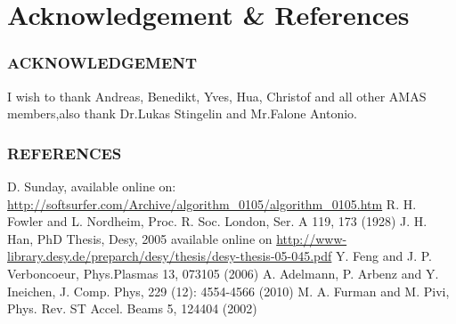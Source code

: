 \documentclass{beamer}
\begin{document}
\section*{Acknowledgement \& References}
\begin{frame}
\frametitle{ACKNOWLEDGEMENT}
I wish to thank Andreas, Benedikt, Yves, Hua, Christof and all other AMAS members,also thank Dr.Lukas Stingelin and Mr.Falone Antonio.
\end{frame}
\begin{frame}
\frametitle{REFERENCES}
\begin{thebibliography}{99}
 D. Sunday,
 available online on:\\ \href{http://softsurfer.com/Archive/algorithm\_0105/algorithm\_0105.htm}{http://softsurfer.com/Archive/algorithm\_0105/algorithm\_0105.htm}
 R. H. Fowler and L. Nordheim, 
Proc. R. Soc. London, Ser. A 119, 173 (1928)
 J. H. Han, PhD Thesis, Desy, 2005 available online on \href{http://www-library.desy.de/preparch/desy/thesis/desy-thesis-05-045.pdf}{http://www-library.desy.de/preparch/desy/thesis/desy-thesis-05-045.pdf}
 Y. Feng and J. P. Verboncoeur,
Phys.Plasmas 13, 073105 (2006)
 A. Adelmann, P. Arbenz and Y. Ineichen, 
J. Comp. Phys, 229 (12): 4554-4566 (2010)
 M. A. Furman and M. Pivi, 
 Phys. Rev. ST Accel. Beams 5, 124404 (2002)

\end{thebibliography}
\end{frame} 
\end{document}
